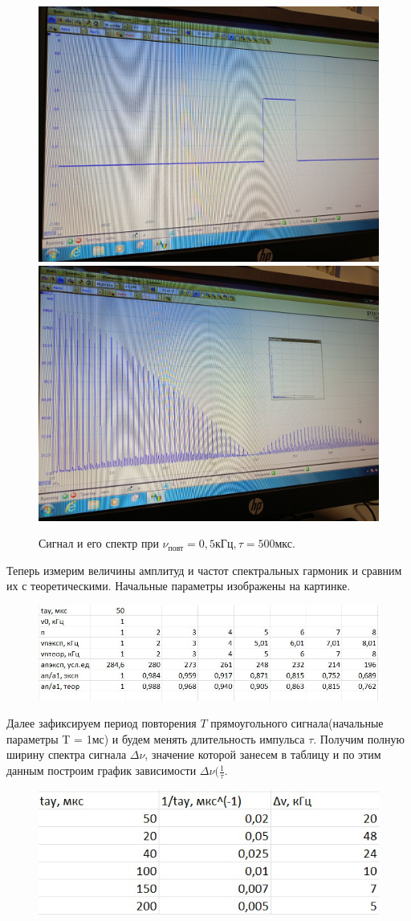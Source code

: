 \documentclass[a4paper,12pt]{article}
\begin{document}
\begin{figure}[H]
    \includegraphics[width=.5\textwidth]{A.6.4.graph}
    \includegraphics[width=.5\textwidth]{A.6.4.spectr}
    \caption{Сигнал и его спектр при $\nu_{\text{повт}} = 0,5 \text{кГц}, \tau = 500 \text{мкс}.$}\label{fig:foobar}
\end{figure}

Теперь измерим величины амплитуд и частот спектральных гармоник и сравним их с теоретическими. Начальные параметры изображены на картинке. 
\begin{figure}[H]
	\begin{center}	
    \includegraphics[width=.8\textwidth]{A.7.data}
    \end{center}
\end{figure}

Далее зафиксируем период повторения $T$ прямоугольного сигнала(начальные параметры T = 1мс) и будем менять длительность импульса $\tau$. Получим полную ширину спектра сигнала $\Delta \nu$, значение которой занесем в таблицу и по этим данным построим график зависимости $\Delta \nu(\frac{1}{\tau}$.

\begin{figure}[H]
	\begin{center}
    \includegraphics[width=.5\textwidth]{A.8.tabl}
\label{fig:foobar}
	\end{center}
\end{figure}
\end{document}
